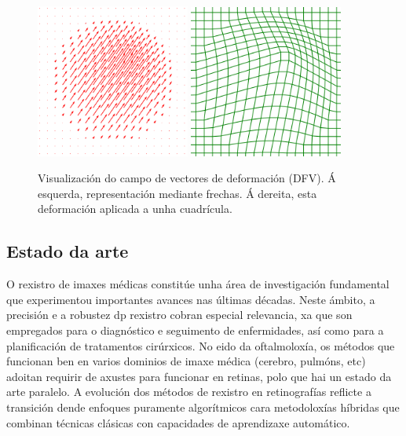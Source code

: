 \begin{figure}[ht!]
    \centering
    \includegraphics[width=0.45\textwidth]{imaxes/dfv_arrows.png}
    \includegraphics[width=0.45\textwidth]{imaxes/dfv_grid.png}
    \caption{Visualización do campo de vectores de deformación (DFV). Á esquerda, representación mediante frechas. Á dereita, esta deformación aplicada a unha cuadrícula.}
    \label{fig:dfv_visualization}
\end{figure}

\subsection{Estado da arte}
\label{subsec:Estado da arte}


O rexistro de imaxes médicas constitúe unha área de investigación fundamental que experimentou importantes avances nas últimas décadas. Neste ámbito, a precisión e a robustez dp rexistro cobran especial relevancia, xa que son empregados para o diagnóstico e seguimento de enfermidades, así como para a planificación de tratamentos cirúrxicos.
No eido da oftalmoloxía, os métodos que funcionan ben en varios dominios de imaxe médica (cerebro, pulmóns, etc) adoitan requirir de axustes para funcionar en retinas, polo que hai un estado da arte paralelo. 
A evolución dos métodos de rexistro en retinografías reflicte a transición dende enfoques puramente algorítmicos cara metodoloxías híbridas que combinan técnicas clásicas con capacidades de aprendizaxe automático.


